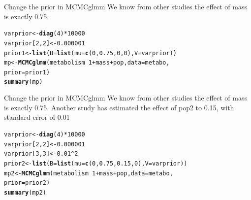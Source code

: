 \documentclass[10pt]{beamer}\usepackage[]{graphicx}\usepackage[]{color}
\makeatletter
\newcommand{\hlnum}[1]{\textcolor[rgb]{0.686,0.059,0.569}{#1}}%
\newcommand{\hlopt}[1]{\textcolor[rgb]{0,0,0}{#1}}%
\newcommand{\hlstd}[1]{\textcolor[rgb]{0.345,0.345,0.345}{#1}}%
\newcommand{\hlkwb}[1]{\textcolor[rgb]{0.69,0.353,0.396}{#1}}%
\newcommand{\hlkwc}[1]{\textcolor[rgb]{0.333,0.667,0.333}{#1}}%
\newcommand{\hlkwd}[1]{\textcolor[rgb]{0.737,0.353,0.396}{\textbf{#1}}}%
\newenvironment{kframe}{%
 \def\at@end@of@kframe{}%
 \ifinner\ifhmode%
  \def\at@end@of@kframe{\end{minipage}}%
  \begin{minipage}{\columnwidth}%
 \fi\fi%
 \def\FrameCommand##1{\hskip\@totalleftmargin \hskip-\fboxsep
 \colorbox{shadecolor}{##1}\hskip-\fboxsep
     \hskip-\linewidth \hskip-\@totalleftmargin \hskip\columnwidth}%
 \MakeFramed {\advance\hsize-\width
   \@totalleftmargin\z@ \linewidth\hsize
   \@setminipage}}%
 {\par\unskip\endMakeFramed%
 \at@end@of@kframe}
\newenvironment{knitrout}{}{} %
\makeatother
\begin{document}
\begin{frame}[fragile]{Change the prior in MCMCglmm}
We know from other studies the effect of mass is exactly 0.75.
\begin{knitrout}\small
{}\color{fgcolor}\begin{kframe}
\begin{alltt}
\hlstd{varprior} \hlkwb{<-} \hlkwd{diag}\hlstd{(}\hlnum{4}\hlstd{)}\hlopt{*}\hlnum{10000}
\hlstd{varprior[}\hlnum{2}\hlstd{,}\hlnum{2}\hlstd{]} \hlkwb{<-} \hlnum{0.000001}
\hlstd{prior1} \hlkwb{<-} \hlkwd{list}\hlstd{(}\hlkwc{B}\hlstd{=} \hlkwd{list}\hlstd{(}\hlkwc{mu}\hlstd{=}\hlkwd{c}\hlstd{(}\hlnum{0}\hlstd{,}\hlnum{0.75}\hlstd{,}\hlnum{0}\hlstd{,}\hlnum{0}\hlstd{),} \hlkwc{V}\hlstd{=varprior))}
\hlstd{mp} \hlkwb{<-} \hlkwd{MCMCglmm}\hlstd{(metabolism} \hlopt{~} \hlnum{1} \hlopt{+} \hlstd{mass} \hlopt{+} \hlstd{pop,} \hlkwc{data} \hlstd{= metabo,}
               \hlkwc{prior} \hlstd{= prior1)}
\hlkwd{summary}\hlstd{(mp)}
\end{alltt}
\end{kframe}
\end{knitrout}

\end{frame}

\begin{frame}[fragile]{Change the prior in MCMCglmm}
We know from other studies the effect of mass is exactly 0.75.
Another study has estimated the effect of pop2 to 0.15, with standard error of 0.01
\begin{knitrout}\small
{}\color{fgcolor}\begin{kframe}
\begin{alltt}
\hlstd{varprior} \hlkwb{<-} \hlkwd{diag}\hlstd{(}\hlnum{4}\hlstd{)}\hlopt{*}\hlnum{10000}
\hlstd{varprior[}\hlnum{2}\hlstd{,}\hlnum{2}\hlstd{]} \hlkwb{<-} \hlnum{0.000001}
\hlstd{varprior[}\hlnum{3}\hlstd{,}\hlnum{3}\hlstd{]} \hlkwb{<-} \hlnum{0.01}\hlopt{^}\hlnum{2}
\hlstd{prior2} \hlkwb{<-} \hlkwd{list}\hlstd{(}\hlkwc{B}\hlstd{=} \hlkwd{list}\hlstd{(}\hlkwc{mu}\hlstd{=}\hlkwd{c}\hlstd{(}\hlnum{0}\hlstd{,}\hlnum{0.75}\hlstd{,}\hlnum{0.15}\hlstd{,}\hlnum{0}\hlstd{),} \hlkwc{V}\hlstd{=varprior))}
\hlstd{mp2} \hlkwb{<-} \hlkwd{MCMCglmm}\hlstd{(metabolism} \hlopt{~} \hlnum{1} \hlopt{+} \hlstd{mass} \hlopt{+} \hlstd{pop,} \hlkwc{data} \hlstd{= metabo,}
                \hlkwc{prior} \hlstd{= prior2)}
\hlkwd{summary}\hlstd{(mp2)}
\end{alltt}
\end{kframe}
\end{knitrout}
\end{frame}
\end{document}
